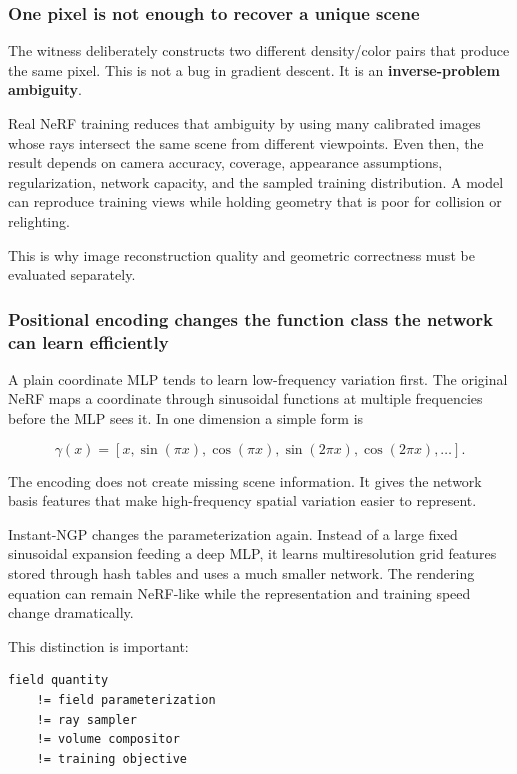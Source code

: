 \subsubsection{One pixel is not enough to recover a unique scene}\label{04-visual-computing-ii-ch035-one-pixel-is-not-enough-to-recover-a-unique-scene}

The witness deliberately constructs two different density/color pairs that produce the same pixel. This is not a bug in gradient descent. It is an \textbf{inverse-problem ambiguity}.

Real NeRF training reduces that ambiguity by using many calibrated images whose rays intersect the same scene from different viewpoints. Even then, the result depends on camera accuracy, coverage, appearance assumptions, regularization, network capacity, and the sampled training distribution. A model can reproduce training views while holding geometry that is poor for collision or relighting.

This is why image reconstruction quality and geometric correctness must be evaluated separately.

\subsubsection{Positional encoding changes the function class the network can learn efficiently}\label{04-visual-computing-ii-ch035-positional-encoding-changes-the-function-class-the-network-can-learn-efficiently}

A plain coordinate MLP tends to learn low-frequency variation first. The original NeRF maps a coordinate through sinusoidal functions at multiple frequencies before the MLP sees it. In one dimension a simple form is

\[\gamma(x)=\left[x,\sin(\pi x),\cos(\pi x),\sin(2\pi x),\cos(2\pi x),\ldots\right].\]

The encoding does not create missing scene information. It gives the network basis features that make high-frequency spatial variation easier to represent.

Instant-NGP changes the parameterization again. Instead of a large fixed sinusoidal expansion feeding a deep MLP, it learns multiresolution grid features stored through hash tables and uses a much smaller network. The rendering equation can remain NeRF-like while the representation and training speed change dramatically.

This distinction is important:

\begin{verbatim}
field quantity
    != field parameterization
    != ray sampler
    != volume compositor
    != training objective
\end{verbatim}

